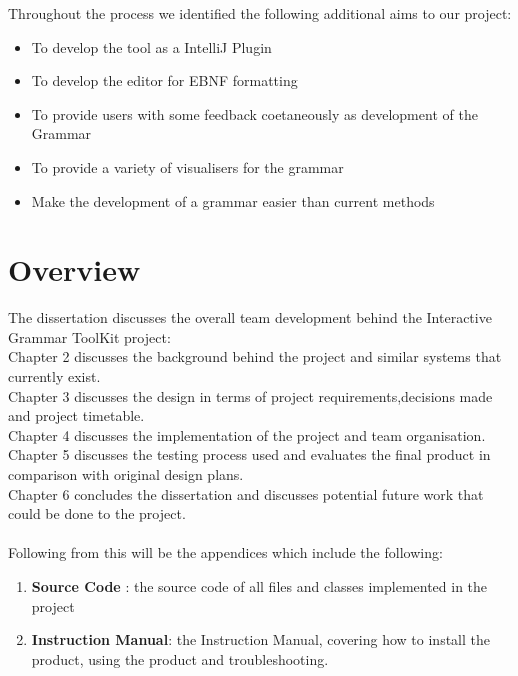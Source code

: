 Throughout the process we identified the following additional aims to our project:
\begin {itemize}
	\item To develop the tool as a IntelliJ Plugin
	\item To develop the editor for EBNF formatting
	\item To provide users with some feedback coetaneously as development of the Grammar
	\item To provide a variety of visualisers for the grammar
	\item Make the development of a grammar easier than current methods
\end{itemize}
 
\section{Overview}
The dissertation discusses the overall team development behind the Interactive Grammar ToolKit project:\\

Chapter 2 discusses the background behind the project and similar systems that currently exist.\\
Chapter 3 discusses the design in terms of project requirements,decisions made and project timetable.\\ 
Chapter 4 discusses the implementation of the project and team organisation.\\
Chapter 5 discusses the testing process used and evaluates the final product in comparison with original design plans.\\
Chapter 6 concludes the dissertation and discusses potential future work that could be done to the project.\\
\\
Following from this will be the appendices which include the following:
\begin {enumerate}
	\item \textbf{Source Code} : the source code of all files and classes implemented in the project
	\item \textbf{Instruction Manual}: the Instruction Manual, covering how to install the product, using the product and troubleshooting.
\end{enumerate}

